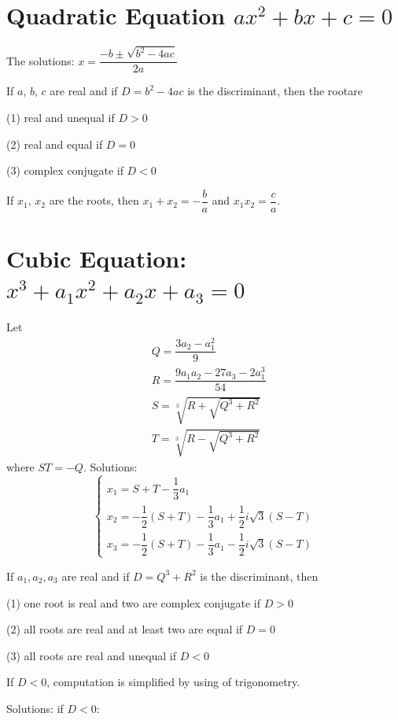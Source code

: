 \section{Quadratic Equation $ax^2+bx+c=0$}

The solutions: $x=\dfrac{-b \pm \sqrt{b^2-4ac}}{2a}$

If $a$, $b$, $c$ are real and if $D=b^2-4ac$ is the discriminant, then the rootare

(1) real and unequal if $D > 0$

(2) real and equal if $D = 0$

(3) complex conjugate if $D < 0$

If $x_1$, $x_2$ are the roots, then $x_1+x_2=-\dfrac{b}{a}$ and $x_1x_2=\dfrac{c}{a}$.

\section{Cubic Equation: $x^3+a_1x^2+a_2x+a_3=0$}

Let $$\begin{aligned} &Q=\dfrac{3a_2-a_1^2}{9}\\  &R=\dfrac{9a_1a_2-27a_3-2a_1^3}{54}\\ &S=\sqrt[3]{R+\sqrt{Q^3+R^2}} \\ &T=\sqrt[3]{R-\sqrt{Q^3+R^2}} \end{aligned}$$
where $ST=-Q$.
Solutions: $$\begin{cases}x_1=S+T-\dfrac{1}{3}a_1\\ x_2=-\dfrac{1}{2}(S+T)-\dfrac{1}{3}a_1+\dfrac{1}{2}i\sqrt{3}(S-T)\\  x_3=-\dfrac{1}{2}(S+T)-\dfrac{1}{3}a_1-\dfrac{1}{2}i\sqrt{3}(S-T)\end{cases}$$

If $a_1, a_2, a_3$ are real and if $D=Q^3+R^2$ is the discriminant, then 

(1) one root is real and two are complex conjugate if $D > 0$

(2) all roots are real and at least two are equal if $D = 0$

(3) all roots are real and unequal if $D < 0$

If $D < 0$, computation is simplified by using of trigonometry.

Solutions: if $D < 0$:
